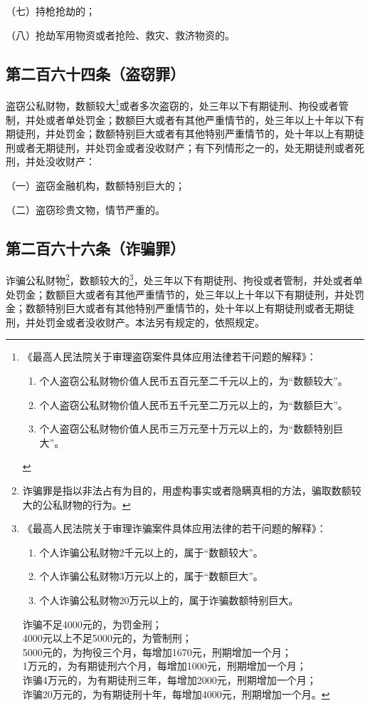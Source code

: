 \documentclass[utf-8,10pt]{ctexart}
\begin{document}
（七）持枪抢劫的；

（八）抢劫军用物资或者抢险、救灾、救济物资的。
\subsection{第二百六十四条（盗窃罪）}
盗窃公私财物，数额较大\footnote{
《最高人民法院关于审理盗窃案件具体应用法律若干问题的解释》：
\begin{enumerate}
\item 个人盗窃公私财物价值人民币五百元至二千元以上的，为“数额较大”。
\item 个人盗窃公私财物价值人民币五千元至二万元以上的，为“数额巨大”。
\item 个人盗窃公私财物价值人民币三万元至十万元以上的，为“数额特别巨大”。
\end{enumerate}
}或者多次盗窃的，处三年以下有期徒刑、拘役或者管制，并处或者单处罚金；数额巨大或者有其他严重情节的，处三年以上十年以下有期徒刑，并处罚金；数额特别巨大或者有其他特别严重情节的，处十年以上有期徒刑或者无期徒刑，并处罚金或者没收财产；有下列情形之一的，处无期徒刑或者死刑，并处没收财产：

（一）盗窃金融机构，数额特别巨大的；

（二）盗窃珍贵文物，情节严重的。
\subsection{第二百六十六条（诈骗罪）}
诈骗公私财物\footnote{
诈骗罪是指以非法占有为目的，用虚构事实或者隐瞒真相的方法，骗取数额较大的公私财物的行为。
}，数额较大的\footnote{
《最高人民法院关于审理诈骗案件具体应用法律的若干问题的解释》：
\begin{enumerate}
\item 个人诈骗公私财物2千元以上的，属于“数额较大”。
\item 个人诈骗公私财物3万元以上的，属于“数额巨大”。
\item 个人诈骗公私财物20万元以上的，属于诈骗数额特别巨大。
\end{enumerate}
诈骗不足4000元的，为罚金刑；\\
4000元以上不足5000元的，为管制刑；\\
5000元的，为拘役三个月，每增加1670元，刑期增加一个月；\\
1万元的，为有期徒刑六个月，每增加1000元，刑期增加一个月；\\
诈骗4万元的，为有期徒刑三年，每增加2000元，刑期增加一个月；\\
诈骗20万元的，为有期徒刑十年，每增加4000元，刑期增加一个月。
}，处三年以下有期徒刑、拘役或者管制，并处或者单处罚金；数额巨大或者有其他严重情节的，处三年以上十年以下有期徒刑，并处罚金；数额特别巨大或者有其他特别严重情节的，处十年以上有期徒刑或者无期徒刑，并处罚金或者没收财产。本法另有规定的，依照规定。
\end{document}

